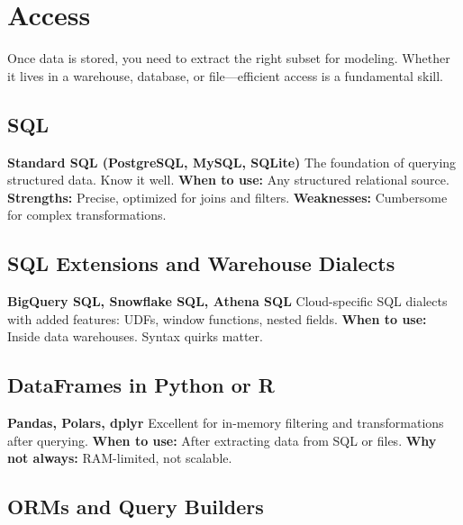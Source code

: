 \documentclass[12pt,openany, draft]{book}
\begin{document}
\section{Access}

Once data is stored, you need to extract the right subset for modeling. Whether it lives in a warehouse, database, or file—efficient access is a fundamental skill.

\subsection*{SQL}

\textbf{Standard SQL (PostgreSQL, MySQL, SQLite)} \newline
The foundation of querying structured data. Know it well. \newline
\textbf{When to use:} Any structured relational source. \newline
\textbf{Strengths:} Precise, optimized for joins and filters. \newline
\textbf{Weaknesses:} Cumbersome for complex transformations.

\subsection*{SQL Extensions and Warehouse Dialects}

\textbf{BigQuery SQL, Snowflake SQL, Athena SQL} \newline
Cloud-specific SQL dialects with added features: UDFs, window functions, nested fields. \newline
\textbf{When to use:} Inside data warehouses. Syntax quirks matter.

\subsection*{DataFrames in Python or R}

\textbf{Pandas, Polars, dplyr} \newline
Excellent for in-memory filtering and transformations after querying. \newline
\textbf{When to use:} After extracting data from SQL or files. \newline
\textbf{Why not always:} RAM-limited, not scalable.

\subsection*{ORMs and Query Builders}
\end{document}

